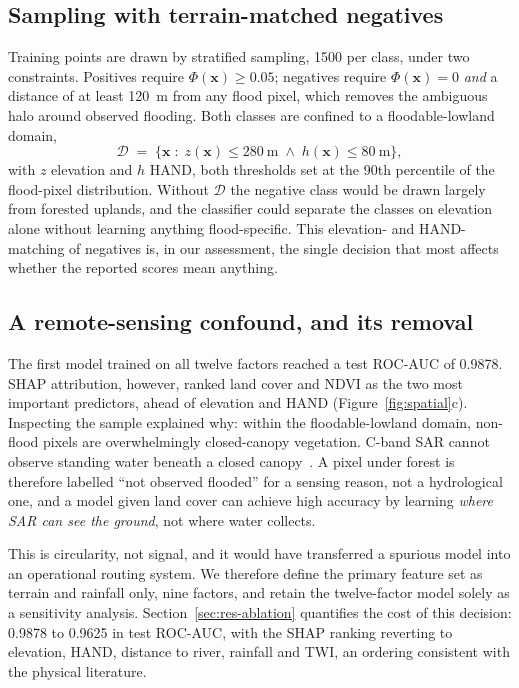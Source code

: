 \documentclass[journal]{IEEEtran}
\begin{document}
\subsection{Sampling with terrain-matched negatives}
Training points are drawn by stratified sampling, \num{1500} per class, under two
constraints. Positives require $\Phi(\mathbf{x})\ge 0.05$; negatives require
$\Phi(\mathbf{x})=0$ \emph{and} a distance of at least \SI{120}{\metre} from any
flood pixel, which removes the ambiguous halo around observed flooding. Both
classes are confined to a floodable-lowland domain,
\begin{equation}
\mathcal{D} \;=\; \bigl\{\mathbf{x} \;:\; z(\mathbf{x}) \le \SI{280}{\metre}
\;\wedge\; h(\mathbf{x}) \le \SI{80}{\metre}\bigr\},
\label{eq:domain}
\end{equation}
with $z$ elevation and $h$ HAND, both thresholds set at the 90th percentile of
the flood-pixel distribution. Without $\mathcal{D}$ the negative class would be
drawn largely from forested uplands, and the classifier could separate the
classes on elevation alone without learning anything flood-specific. This
elevation- and HAND-matching of negatives is, in our assessment, the single
decision that most affects whether the reported scores mean anything.

\subsection{A remote-sensing confound, and its removal}
\label{sec:method-confound}
The first model trained on all twelve factors reached a test ROC-AUC of 0.9878.
SHAP attribution, however, ranked land cover and NDVI as the two most important
predictors, ahead of elevation and HAND (Figure~\ref{fig:spatial}c). Inspecting
the sample explained why: within the floodable-lowland domain, non-flood pixels
are overwhelmingly closed-canopy vegetation. C-band SAR cannot observe standing
water beneath a closed canopy~\citep{townsend2002,tsyganskaya2018}. A pixel under
forest is therefore labelled ``not observed flooded'' for a sensing reason, not a
hydrological one, and a model given land cover can achieve high accuracy by
learning \emph{where SAR can see the ground}, not where water collects.

This is circularity, not signal, and it would have transferred a spurious model
into an operational routing system. We therefore define the primary feature set
as terrain and rainfall only, nine factors, and retain the twelve-factor model
solely as a sensitivity analysis. Section~\ref{sec:res-ablation} quantifies the
cost of this decision: 0.9878 to 0.9625 in test ROC-AUC, with the SHAP ranking
reverting to elevation, HAND, distance to river, rainfall and TWI, an ordering
consistent with the physical literature.
\end{document}
